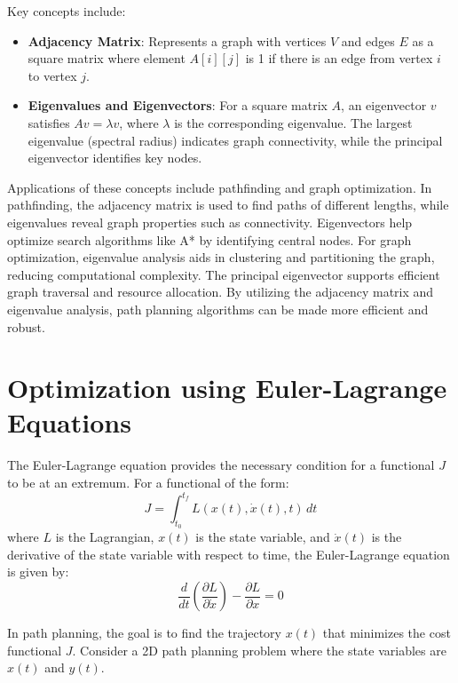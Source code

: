 \documentclass[12pt]{article}
\begin{document}
Key concepts include:

\begin{itemize}
    \item \textbf{Adjacency Matrix}: Represents a graph with vertices \( V \) and edges \( E \) as a square matrix where element \( A[i][j] \) is 1 if there is an edge from vertex \( i \) to vertex \( j \).
    \item \textbf{Eigenvalues and Eigenvectors}: For a square matrix \( A \), an eigenvector \( v \) satisfies \( Av = \lambda v \), where \( \lambda \) is the corresponding eigenvalue. The largest eigenvalue (spectral radius) indicates graph connectivity, while the principal eigenvector identifies key nodes.
\end{itemize}

Applications of these concepts include pathfinding and graph optimization. In pathfinding, the adjacency matrix is used to find paths of different lengths, while eigenvalues reveal graph properties such as connectivity. Eigenvectors help optimize search algorithms like A* by identifying central nodes. For graph optimization, eigenvalue analysis aids in clustering and partitioning the graph, reducing computational complexity. The principal eigenvector supports efficient graph traversal and resource allocation. By utilizing the adjacency matrix and eigenvalue analysis, path planning algorithms can be made more efficient and robust.

\newpage
\section{Optimization using Euler-Lagrange Equations}

The Euler-Lagrange equation provides the necessary condition for a functional \( J \) to be at an extremum. For a functional of the form:
\begin{equation}
    J = \int_{t_0}^{t_f} L(x(t), \dot{x}(t), t) \, dt
\end{equation}
where \( L \) is the Lagrangian, \( x(t) \) is the state variable, and \( \dot{x}(t) \) is the derivative of the state variable with respect to time, the Euler-Lagrange equation is given by:
\begin{equation}
    \frac{d}{dt} \left( \frac{\partial L}{\partial \dot{x}} \right) - \frac{\partial L}{\partial x} = 0
\end{equation}



In path planning, the goal is to find the trajectory \( x(t) \) that minimizes the cost functional \( J \). Consider a 2D path planning problem where the state variables are \( x(t) \) and \( y(t) \).
\end{document}
